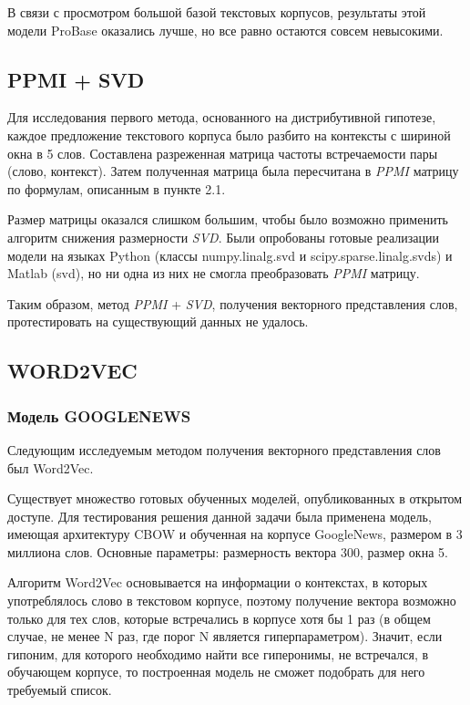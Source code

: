В связи с просмотром большой базой текстовых корпусов, результаты этой модели ProBase оказались лучше, но все равно остаются совсем невысокими.



\subsection{PPMI + SVD}

Для исследования первого метода, основанного на дистрибутивной гипотезе, каждое
предложение текстового корпуса было разбито на контексты с шириной окна в 5 слов.
Составлена разреженная матрица частоты встречаемости пары (слово, контекст). Затем
полученная матрица была пересчитана в \textit{PPMI} матрицу по формулам, описанным в пункте
2.1.

Размер матрицы оказался слишком большим, чтобы было возможно применить алгоритм
снижения размерности \textit{SVD}. Были опробованы готовые реализации модели на языках
Python (классы numpy.linalg.svd и scipy.sparse.linalg.svds) и Matlab (svd), но ни одна из них не смогла преобразовать \textit{PPMI} матрицу.

Таким образом, метод \textit{PPMI} + \textit{SVD}, получения векторного представления слов,
протестировать на существующий данных не удалось.





\subsection{WORD2VEC}

\subsubsection{Модель GOOGLENEWS}

Следующим исследуемым методом получения векторного представления слов был
Word2Vec.

Существует множество готовых обученных моделей, опубликованных в открытом доступе.
Для тестирования решения данной задачи была применена модель, имеющая архитектуру
CBOW и обученная на корпусе GoogleNews, размером в 3 миллиона слов. Основные
параметры: размерность вектора 300, размер окна 5.

Алгоритм Word2Vec основывается на информации о контекстах, в которых употреблялось
слово в текстовом корпусе, поэтому получение вектора возможно только для тех слов,
которые встречались в корпусе хотя бы 1 раз (в общем случае, не менее N раз, где порог N
является гиперпараметром). Значит, если гипоним, для которого необходимо найти все
гиперонимы, не встречался, в обучающем корпусе, то построенная модель не сможет
подобрать для него требуемый список.

